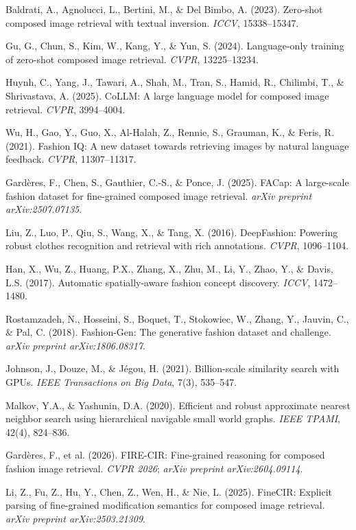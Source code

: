 \documentclass[a4paper]{article}
\begin{document}
\begin{enumerate}[label={[\arabic*]},leftmargin=*,itemsep=3pt]
\item Baldrati, A., Agnolucci, L., Bertini, M., \& Del Bimbo, A. (2023). Zero-shot composed image retrieval with textual inversion. \textit{ICCV}, 15338--15347.
\item Gu, G., Chun, S., Kim, W., Kang, Y., \& Yun, S. (2024). Language-only training of zero-shot composed image retrieval. \textit{CVPR}, 13225--13234.
\item Huynh, C., Yang, J., Tawari, A., Shah, M., Tran, S., Hamid, R., Chilimbi, T., \& Shrivastava, A. (2025). CoLLM: A large language model for composed image retrieval. \textit{CVPR}, 3994--4004.
\item Wu, H., Gao, Y., Guo, X., Al-Halah, Z., Rennie, S., Grauman, K., \& Feris, R. (2021). Fashion IQ: A new dataset towards retrieving images by natural language feedback. \textit{CVPR}, 11307--11317.
\item Gardères, F., Chen, S., Gauthier, C.-S., \& Ponce, J. (2025). FACap: A large-scale fashion dataset for fine-grained composed image retrieval. \textit{arXiv preprint arXiv:2507.07135}.
\item Liu, Z., Luo, P., Qiu, S., Wang, X., \& Tang, X. (2016). DeepFashion: Powering robust clothes recognition and retrieval with rich annotations. \textit{CVPR}, 1096--1104.
\item Han, X., Wu, Z., Huang, P.X., Zhang, X., Zhu, M., Li, Y., Zhao, Y., \& Davis, L.S. (2017). Automatic spatially-aware fashion concept discovery. \textit{ICCV}, 1472--1480.
\item Rostamzadeh, N., Hosseini, S., Boquet, T., Stokowiec, W., Zhang, Y., Jauvin, C., \& Pal, C. (2018). Fashion-Gen: The generative fashion dataset and challenge. \textit{arXiv preprint arXiv:1806.08317}.
\item Johnson, J., Douze, M., \& Jégou, H. (2021). Billion-scale similarity search with GPUs. \textit{IEEE Transactions on Big Data}, 7(3), 535--547.
\item Malkov, Y.A., \& Yashunin, D.A. (2020). Efficient and robust approximate nearest neighbor search using hierarchical navigable small world graphs. \textit{IEEE TPAMI}, 42(4), 824--836.
\item Gardères, F., et al. (2026). FIRE-CIR: Fine-grained reasoning for composed fashion image retrieval. \textit{CVPR 2026}; \textit{arXiv preprint arXiv:2604.09114}.
\item Li, Z., Fu, Z., Hu, Y., Chen, Z., Wen, H., \& Nie, L. (2025). FineCIR: Explicit parsing of fine-grained modification semantics for composed image retrieval. \textit{arXiv preprint arXiv:2503.21309}.

\end{enumerate}
\end{document}
